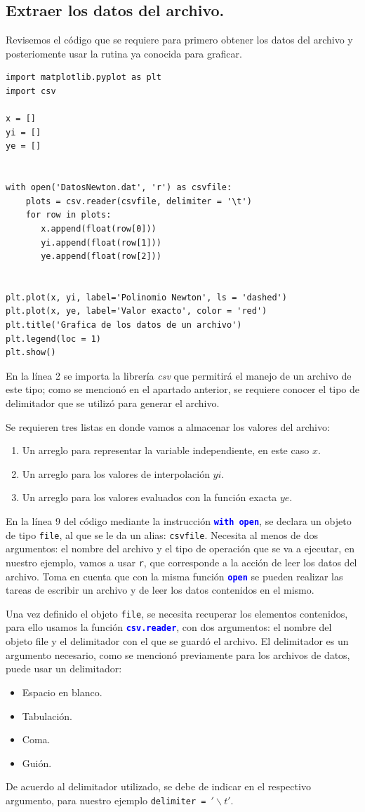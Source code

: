 \documentclass[12pt]{article}
\newcommand{\azulfuerte}[1]{\textcolor{blue}{\textbf{#1}}}
\begin{document}
\subsection{Extraer los datos del archivo.}
Revisemos el código que se requiere para primero obtener los datos del archivo y posteriomente usar la rutina ya conocida para graficar.
\begin{lstlisting}[style= FormattedNumber, basicstyle=\linespread{1.1}\ttfamily=\normal, columns=fullflexible]
import matplotlib.pyplot as plt
import csv

x = []
yi = []
ye = []


with open('DatosNewton.dat', 'r') as csvfile:
    plots = csv.reader(csvfile, delimiter = '\t')
    for row in plots:
       x.append(float(row[0]))
       yi.append(float(row[1]))
       ye.append(float(row[2]))
       

plt.plot(x, yi, label='Polinomio Newton', ls = 'dashed')
plt.plot(x, ye, label='Valor exacto', color = 'red')
plt.title('Grafica de los datos de un archivo')
plt.legend(loc = 1)
plt.show()
\end{lstlisting}
En la línea 2 se importa la librería \emph{csv} que permitirá el manejo de un archivo de este tipo; como se mencionó en el apartado anterior, se requiere conocer el tipo de delimitador que se utilizó para generar el archivo.
\par
Se requieren tres listas en donde vamos a almacenar los valores del archivo:
\begin{enumerate}
\item Un arreglo para representar la variable independiente, en este caso $x$.
\item Un arreglo para los valores de interpolación $yi$.
\item Un arreglo para los valores evaluados con la función exacta $ye$.
\end{enumerate}
En la línea 9 del código mediante la instrucción \azulfuerte{\texttt{with open}}, se declara un objeto de tipo \texttt{file}, al que se le da un alias: \texttt{csvfile}. Necesita al menos de dos argumentos: el nombre del archivo y el tipo de operación que se va a ejecutar, en nuestro ejemplo, vamos a usar \texttt{r}, que corresponde a la acción de leer los datos del archivo. Toma en cuenta que con la misma función \azulfuerte{\texttt{open}}	se pueden realizar las tareas de escribir un archivo y de leer los datos contenidos en el mismo.
\par
Una vez definido el objeto \texttt{file}, se necesita recuperar los elementos contenidos, para ello usamos la función \azulfuerte{\texttt{csv.reader}}, con dos argumentos: el nombre del objeto file y el delimitador con el que se guardó el archivo. El delimitador es un argumento necesario, como se mencionó previamente para los archivos de datos, puede usar un delimitador:
\begin{itemize}
\item Espacio en blanco.
\item Tabulación.
\item Coma.
\item Guión.
\end{itemize}
De acuerdo al delimitador utilizado, se debe de indicar en el respectivo argumento, para nuestro ejemplo \texttt{delimiter = $'\backslash t'$}.
\end{document}
